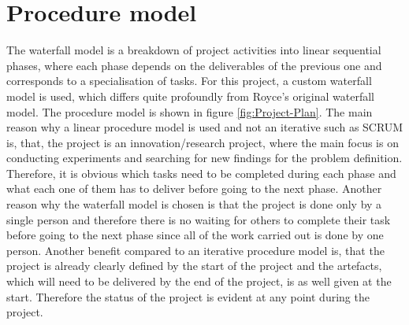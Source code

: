 \clearpage
{}

\section{Procedure model}
\label{sec:Procedure-Model}
The waterfall model is a breakdown of project activities into linear sequential phases, where each phase depends on the deliverables of the previous one and corresponds to a specialisation of tasks. For this project, a custom waterfall model is used, which differs quite profoundly from Royce's original waterfall model. The procedure model is shown in figure \ref{fig:Project-Plan}.
\newline
\newline
The main reason why a linear procedure model is used and not an iterative such as SCRUM is, that, the project is an innovation/research project, where the main focus is on conducting experiments and searching for new findings for the problem definition. Therefore, it is obvious which tasks need to be completed during each phase and what each one of them has to deliver before going to the next phase. Another reason why the waterfall model is chosen is that the project is done only by a single person and therefore there is no waiting for others to complete their task before going to the next phase since all of the work carried out is done by one person. Another benefit compared to an iterative procedure model is, that the project is already clearly defined by the start of the project and the artefacts, which will need to be delivered by the end of the project, is as well given at the start. Therefore the status of the project is evident at any point during the project.

